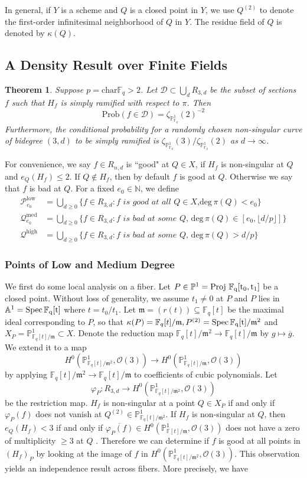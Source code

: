 \documentclass[12pt]{article}
\theoremstyle{plain}
\newtheorem{theorem}[equation]{Theorem}
\theoremstyle{definition}
\newcommand{\fm}{\mathfrak{m}}
\newcommand{\IA}{\mathbb{A}}
\newcommand{\IN}{\mathbb{N}}
\newcommand{\IF}{\mathbb{F}}
\newcommand{\IP}{\mathbb{P}}
\newcommand{\sD}{\mathcal{D}}
\newcommand{\sO}{\mathcal{O}}
\newcommand{\sP}{\mathcal{P}}
\newcommand{\sQ}{\mathcal{Q}}
\renewcommand{\deg}{\mathrm{deg}\,}
\newcommand{\Spec}{\rm Spec\,}
\newcommand{\Proj}{\rm Proj\,}
\newcommand\union{\bigcup}
\newcommand\wb{\overline}
\newcommand{\<}{\langle}
\renewcommand{\>}{\rangle}
\newcommand{\Prob}{\mathrm{Prob}}
\begin{document}
In general, if $Y$ is a scheme and $Q$ is a closed point in $Y$, we use $Q^{(2)}$ to denote the first-order infinitesimal neighborhood of $Q$ in $Y$. The residue field of $Q$ is denoted by $\kappa(Q)$.


\subsection{A Density Result over Finite Fields}
\begin{theorem}
\label{main}
Suppose $p = \mathrm{char } \IF_q > 2$. Let $\sD \subset \union_d R_{3,d}$ be the subset of sections $f$ such that $H_f$ is simply ramified with respect to $\pi$. Then
$$ \Prob(f \in \sD) = \zeta_{\IP^1_{\IF_q}}(2)^{-2} $$ Furthermore, the conditional probability for a randomly chosen non-singular curve of bidegree $(3, d)$ to be simply ramified is $\zeta_{\IP^1_{\IF_q}}(3)/\zeta_{\IP^1_{\IF_q}}(2)$ as $d \to \infty$. 
\end{theorem}
For convenience, we say $f \in R_{n, d}$ is ``good" at $Q \in X$, if $H_f$ is non-singular at $Q$ and $e_Q(H_f) \le 2$. If $Q \not\in H_f$, then by default $f$ is good at $Q$. Otherwise we say that $f$ is bad at $Q$. For a fixed $e_0 \in \IN$, we define 
\begin{align*}
\sP_{e_0}^{\mathrm{low}} &= \union_{d \ge 0} \{ f \in R_{3, d} : f \textit{ is good at all $Q \in X$,}\deg \pi(Q) < e_0\}\\
\sQ_{e_0}^{\mathrm{med}} &= \union_{d \ge 0} \{f \in R_{3, d} : f \textit{ is bad at some $Q$, }\deg \pi(Q) \in [e_0, \lfloor d/p \rfloor]\}\\
\sQ^{\mathrm{high}} &= \union_{d \ge 0} \{f \in R_{3, d} : f \textit{ is bad at some $Q$, }\deg \pi(Q) > d/p\}
\end{align*}
\subsubsection{Points of Low and Medium Degree}
We first do some local analysis on a fiber. Let $P \in \IP^1 = \Proj \, \IF_q[t_0, t_1]$ be a closed point. Without loss of generality, we assume $t_1 \neq 0$ at $P$ and $P$ lies in $\IA^1 = \Spec \IF_q[t]$ where $t = t_0/t_1$.   Let $\fm = (r(t))\subseteq \IF_q[t]$ be the maximal ideal corresponding to $P$, so that $\kappa(P) = \IF_q[t]/\fm, P^{(2)} = \Spec \IF_q[t]/\fm^2$ and $X_P = \IP^1_{\IF_q[t]/\fm} \subset X$. Denote the reduction map $\IF_q[t]/\fm^2 \to \IF_q[t]/\fm$ by $g \mapsto \overline{g}$. We extend it to a map $$ H^0(\IP^1_{\IF_q[t]/\fm^2}, \sO(3)) \to H^0(\IP^1_{\IF_q[t]/\fm}, \sO(3))$$ by applying $\IF_q[t]/\fm^2 \to \IF_q[t]/\fm$ to coefficients of cubic polynomials. Let $$\varphi_P : R_{3, d} \to H^0(\IP^1_{\IF_q[t]/\fm^2}, \sO(3))$$ be the restriction map. $H_f$ is non-singular at a point $Q \in X_P$ if and only if $\varphi_P(f)$ does not vanish at $Q^{(2)} \in \IP^1_{\IF_q[t]/\fm^2}$. If $H_f$ is non-singular at $Q$, then $e_Q(H_f) < 3$ if and only if $\wb{\varphi_P(f)} \in H^0(\IP^1_{\IF[t]/\fm}, \sO(3))$ does not have a zero of multiplicity $\ge 3$ at $Q$ . Therefore we can determine if $f$ is good at all points in $(H_f)_P$ by looking at the image of $f$ in $H^0(\IP^1_{\IF_q[t]/\fm^2}, \sO(3))$. This observation yields an independence result across fibers. More precisely, we have 
\end{document}
